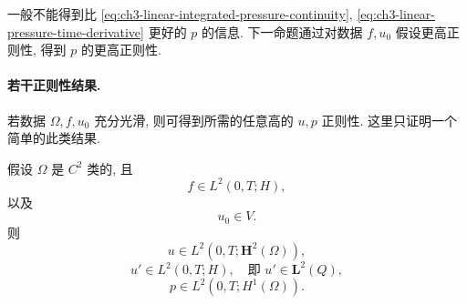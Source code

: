 一般不能得到比 \eqref{eq:ch3-linear-integrated-pressure-continuity}, \eqref{eq:ch3-linear-pressure-time-derivative} 更好的 $p$ 的信息. 下一命题通过对数据 $f,u_0$ 假设更高正则性, 得到 $p$ 的更高正则性.

\paragraph{若干正则性结果.}
若数据 $\Omega,f,u_0$ 充分光滑, 则可得到所需的任意高的 $u,p$ 正则性. 这里只证明一个简单的此类结果.

\begin{Proposition}
\label{prop:ch3-linear-regularity}
假设 $\Omega$ 是 $C^2$ 类的, 且
\begin{equation}
f\in L^2(0,T;H),
\label{eq:ch3-linear-regularity-force}
\end{equation}
以及
\begin{equation}
u_0\in V.
\label{eq:ch3-linear-regularity-initial-data}
\end{equation}
则
\begin{equation}
u\in L^2(0,T;\mathbf H^2(\Omega)),
\label{eq:ch3-linear-spatial-h2-regularity}
\end{equation}
\begin{equation}
u'\in L^2(0,T;H),
\quad\text{即 }u'\in\mathbf L^2(Q),
\label{eq:ch3-linear-time-l2-regularity}
\end{equation}
\begin{equation}
p\in L^2(0,T;H^1(\Omega)).
\label{eq:ch3-linear-pressure-h1-regularity}
\end{equation}
\end{Proposition}

